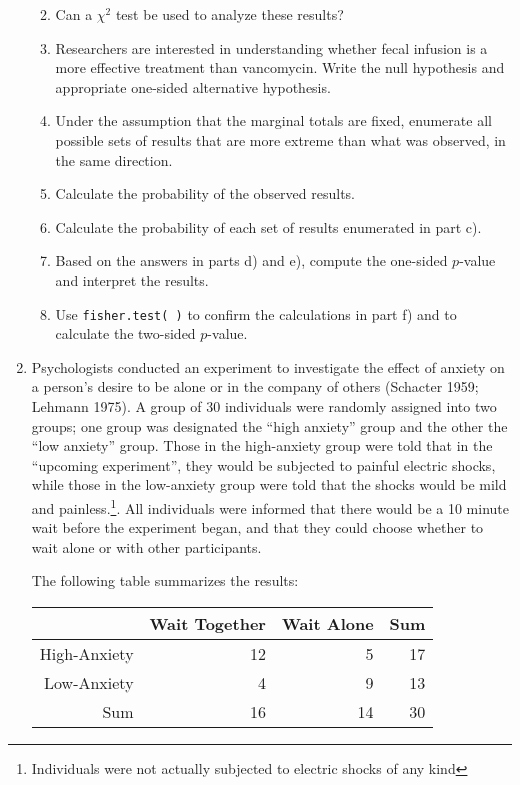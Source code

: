 \documentclass[letterpaper,12pt,twoside,]{pinp}
\begin{document}
\begin{enumerate}
  \begin{enumerate}
  \def\labelenumii{\alph{enumii})}
  \item
    Can a \(\chi^2\) test be used to analyze these results?
  \item
    Researchers are interested in understanding whether fecal infusion
    is a more effective treatment than vancomycin. Write the null
    hypothesis and appropriate one-sided alternative hypothesis.
  \item
    Under the assumption that the marginal totals are fixed, enumerate
    all possible sets of results that are more extreme than what was
    observed, in the same direction.
  \item
    Calculate the probability of the observed results.
  \item
    Calculate the probability of each set of results enumerated in part
    c).
  \item
    Based on the answers in parts d) and e), compute the one-sided
    \(p\)-value and interpret the results.
  \item
    Use \texttt{fisher.test( )} to confirm the calculations in part f)
    and to calculate the two-sided \(p\)-value.
  \end{enumerate}
\item
  Psychologists conducted an experiment to investigate the effect of
  anxiety on a person's desire to be alone or in the company of others
  (Schacter 1959; Lehmann 1975). A group of 30 individuals were randomly
  assigned into two groups; one group was designated the ``high
  anxiety'' group and the other the ``low anxiety'' group. Those in the
  high-anxiety group were told that in the ``upcoming experiment'', they
  would be subjected to painful electric shocks, while those in the
  low-anxiety group were told that the shocks would be mild and
  painless.\footnote{Individuals were not actually subjected to electric shocks of any kind}.
  All individuals were informed that there would be a 10 minute wait
  before the experiment began, and that they could choose whether to
  wait alone or with other participants.

  The following table summarizes the results:

  \begin{table}[h]
   \centering
   \begin{tabular}{rrr|r}
       \hline
       & Wait Together & Wait Alone & Sum \\ 
       \hline
       High-Anxiety & 12 & 5 & 17 \\ 
       Low-Anxiety & 4 & 9 & 13 \\ 
       \hline
       Sum & 16 & 14 & 30 \\ 
       \hline
   \end{tabular}
   \end{table}


\end{enumerate}
\end{document}
